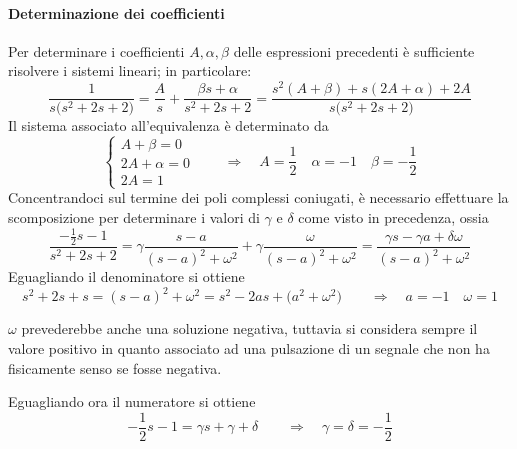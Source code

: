 			\paragraph{Determinazione dei coefficienti} Per determinare i coefficienti $A, \alpha,\beta$ delle espressioni precedenti è sufficiente risolvere i sistemi lineari; in particolare:
			\[ \frac 1 {s \big(s^2+2s + 2\big)} = \frac A s + \frac{\beta s + \alpha}{s^2+2s+2} = \frac {s^2(A+\beta) + s(2A + \alpha) + 2A} {s \big(s^2+2s + 2\big)} \]
			Il sistema associato all'equivalenza è determinato da
			\[\begin{cases}
				A + \beta = 0 \\ 2 A + \alpha = 0 \\ 2 A = 1
			\end{cases} \qquad \Rightarrow \quad A = \frac 1 2 \quad \alpha = - 1 \quad \beta = - \frac 1 2\]
			Concentrandoci sul termine dei poli complessi coniugati, è necessario effettuare la scomposizione per determinare i valori di $\gamma$ e $\delta$ come visto in precedenza, ossia
			\[ \frac{-\frac 1 2 s - 1}{s^2+2s+2} = \gamma \frac{s-a}{(s-a)^2 + \omega^2} + \gamma \frac \omega {(s-a)^2 + \omega^2} = \frac{\gamma s - \gamma a+ \delta \omega}{(s-a)^2+\omega^2} \]
			Eguagliando il denominatore si ottiene
			\[ s^2+2s + s = (s-a)^2 + \omega^2 = s^2-2as + \big(a^2+\omega^2\big) \qquad \Rightarrow \quad a = -1 \quad \omega = 1 \]
			\begin{nota}
				$\omega$ prevederebbe anche una soluzione negativa, tuttavia si considera sempre il valore positivo in quanto associato ad una pulsazione di un segnale che non ha fisicamente senso se fosse negativa.
			\end{nota}
			Eguagliando ora il numeratore si ottiene
			\[ -\frac 1 2 s - 1 = \gamma s +\gamma + \delta \qquad \Rightarrow \quad \gamma = \delta = -\frac 1 2 \]
		
